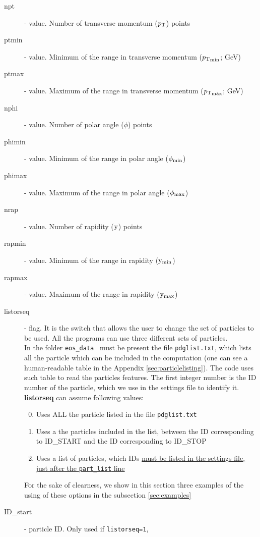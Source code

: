\begin{description}
 \item[npt] \integer - value. Number of transverse momentum ($p_\mathrm{T}$) points
\item[ptmin] \real - value. Minimum of the range in transverse momentum (${p_\mathrm{T}}_{\rm min}$; GeV) 
\item[ptmax] \real - value. Maximum of the range in transverse momentum (${p_\mathrm{T}}_{\rm max}$; GeV) 
\item[nphi]  \integer - value. Number of polar angle ($\phi$)  points
\item[phimin] \real - value. Minimum of the range in polar angle  ($\phi_{\rm min}$)
\item[phimax] \real - value. Maximum of the range in polar angle  ($\phi_{\rm max}$)
\item[nrap] \integer - value. Number of rapidity ($\mathrm{y}$) points 
\item[rapmin] \real - value. Minimum of the range in rapidity ($\mathrm{y}_{\rm min}$)
\item[rapmax] \real - value. Maximum of the range in rapidity ($\mathrm{y}_{\rm max}$)
\item[listorseq] \integer - flag. It is the switch that allows the user to 
 change the set of particles to be used. 
 All the programs can use three different sets of particles. \\
In the folder {\tt eos\_data } must be present the file {\tt pdglist.txt}, which lists all the 
particle which can be included in the computation (one can see a human-readable 
table in the Appendix \ref{sec:particlelisting}). The code uses such table to 
read the particles features. The first integer number is the ID number of the 
particle, which we use in the settings file to identify it. 
 \textbf{listorseq}   can assume following values:
 \begin{enumerate} \setcounter{enumi}{-1}
  \item Uses ALL the particle listed in the file {\tt pdglist.txt}
  \item Uses a the particles included in the list, between the ID corresponding
  to ID\_START and the ID corresponding to ID\_STOP 
  \item Uses a list of particles, which IDs \underline{must be listed in the settings file, just after the {\tt part\_list} line}
 \end{enumerate}
 For the sake of clearness, we show in this section three examples of the using 
 of these options in the subsection \ref{sec:examples}
 \item[ID\_start] \integer - particle ID. Only used if {\tt listorseq=1}, 

\end{description}
